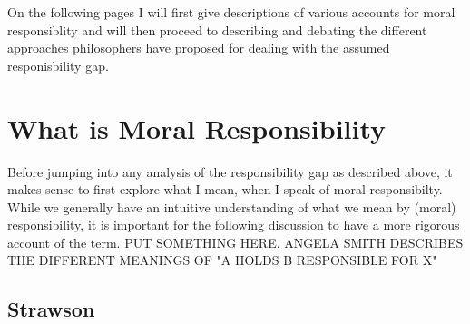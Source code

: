 \documentclass{article}
\begin{document}
On the following pages I will first give descriptions of various accounts for
moral responsiblity and will then proceed to describing and debating the
different approaches philosophers have proposed for dealing with the assumed
responisbility gap.

%
%
%
%
%
\newpage
\section{What is Moral Responsibility}

Before jumping into any analysis of the responsibility gap as described above,
it makes sense to first explore what I mean, when I speak of moral
responsibilty. While we generally have an intuitive understanding of what we mean
by (moral) responsibility, it is important for the following discussion to have
a more rigorous account of the term. PUT SOMETHING HERE.
ANGELA SMITH DESCRIBES THE DIFFERENT MEANINGS OF "A HOLDS B RESPONSIBLE FOR X"

\subsection{Strawson}
\end{document}
